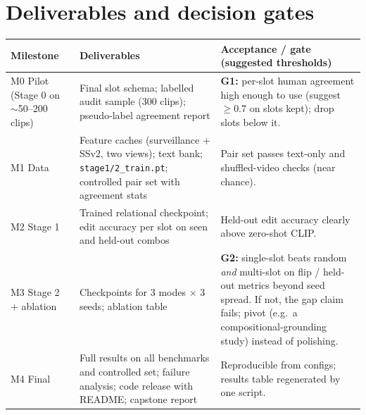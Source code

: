 \documentclass[11pt,a4paper]{article}
\newcommand{\code}[1]{\texttt{#1}}
\begin{document}
\section{Deliverables and decision gates}
\label{sec:deliver}
\begin{tabularx}{\linewidth}{@{}l Y Y@{}}
\toprule
Milestone & Deliverables & Acceptance / gate (suggested thresholds)\\
\midrule
M0 Pilot (Stage 0 on $\sim$50--200 clips) & Final slot schema; labelled audit sample (300 clips); pseudo-label agreement report & \textbf{G1:} per-slot human agreement high enough to use (suggest $\ge$0.7 on slots kept); drop slots below it.\\
M1 Data & Feature caches (surveillance + SSv2, two views); text bank; \code{stage1/2\_train.pt}; controlled pair set with agreement stats & Pair set passes text-only and shuffled-video checks (near chance).\\
M2 Stage 1 & Trained relational checkpoint; edit accuracy per slot on seen and held-out combos & Held-out edit accuracy clearly above zero-shot CLIP.\\
M3 Stage 2 + ablation & Checkpoints for 3 modes $\times$ 3 seeds; ablation table & \textbf{G2:} single-slot beats random \emph{and} multi-slot on flip / held-out metrics beyond seed spread. If not, the gap claim fails; pivot (e.g.\ a compositional-grounding study) instead of polishing.\\
M4 Final & Full results on all benchmarks and controlled set; failure analysis; code release with README; capstone report & Reproducible from configs; results table regenerated by one script.\\
\bottomrule
\end{tabularx}

\end{document}
